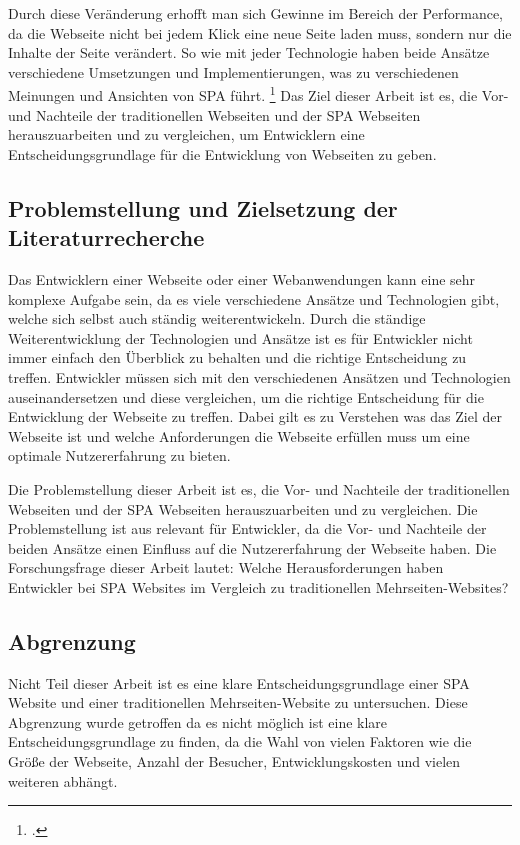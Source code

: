 Durch diese Veränderung erhofft man sich Gewinne im Bereich der Performance, da die Webseite nicht bei jedem Klick eine neue Seite laden muss, sondern nur die Inhalte der Seite verändert.
So wie mit jeder Technologie haben beide Ansätze verschiedene Umsetzungen und Implementierungen, was zu verschiedenen Meinungen und Ansichten von \ac{SPA} führt. \footcite[Vgl.][Seite 4]{Flanagan2011}
Das Ziel dieser Arbeit ist es, die Vor- und Nachteile der traditionellen Webseiten und der \ac{SPA} Webseiten herauszuarbeiten und zu vergleichen,
um Entwicklern eine Entscheidungsgrundlage für die Entwicklung von Webseiten zu geben.

\subsection{Problemstellung und Zielsetzung der Literaturrecherche}
Das Entwicklern einer Webseite oder einer Webanwendungen kann eine sehr komplexe Aufgabe sein, da es viele verschiedene Ansätze und Technologien gibt, welche sich selbst auch ständig weiterentwickeln.
Durch die ständige Weiterentwicklung der Technologien und Ansätze ist es für Entwickler nicht immer einfach den Überblick zu behalten und die richtige Entscheidung zu treffen.
Entwickler müssen sich mit den verschiedenen Ansätzen und Technologien auseinandersetzen und diese vergleichen, um die richtige Entscheidung für die Entwicklung der Webseite zu treffen.
Dabei gilt es zu Verstehen was das Ziel der Webseite ist und welche Anforderungen die Webseite erfüllen muss um eine optimale Nutzererfahrung zu bieten.

Die Problemstellung dieser Arbeit ist es, die Vor- und Nachteile der traditionellen Webseiten und der \ac{SPA} Webseiten herauszuarbeiten und zu vergleichen.
Die Problemstellung ist aus relevant für Entwickler, da die Vor- und Nachteile der beiden Ansätze einen Einfluss auf die Nutzererfahrung der Webseite haben.
Die Forschungsfrage dieser Arbeit lautet: Welche Herausforderungen haben Entwickler bei \ac{SPA} Websites im Vergleich zu traditionellen Mehrseiten-Websites?

\subsection{Abgrenzung}
Nicht Teil dieser Arbeit ist es eine klare Entscheidungsgrundlage einer \ac{SPA} Website und einer traditionellen Mehrseiten-Website zu untersuchen.
Diese Abgrenzung wurde getroffen da es nicht möglich ist eine klare Entscheidungsgrundlage zu finden, da die Wahl von vielen Faktoren wie die Größe der Webseite,
Anzahl der Besucher, Entwicklungskosten und vielen weiteren abhängt.

